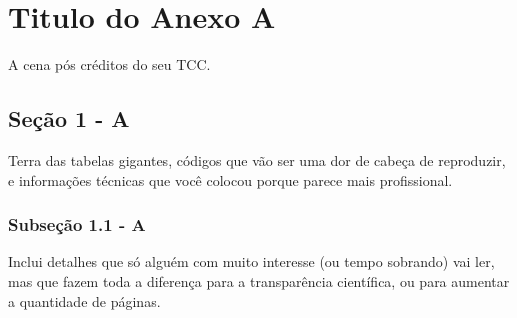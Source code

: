 %
%

\chapter{Titulo do Anexo A}\label{apen:annexA}

A cena pós créditos do seu TCC. 

\section{Seção 1 - A}

Terra das tabelas gigantes, códigos que vão ser uma dor de cabeça de reproduzir, e informações técnicas que você colocou porque parece mais profissional.

\subsection{Subseção 1.1 - A}

Inclui detalhes que só alguém com muito interesse (ou tempo sobrando) vai ler, mas que fazem toda a diferença para a transparência científica, ou para aumentar a quantidade de páginas.
